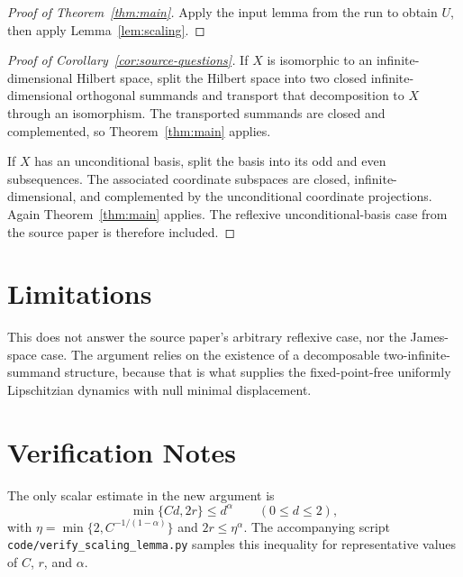 \documentclass[11pt]{article}
\begin{document}
\begin{proof}[Proof of Theorem~\ref{thm:main}]
Apply the input lemma from the run to obtain \(U\), then apply
Lemma~\ref{lem:scaling}.
\end{proof}

\begin{proof}[Proof of Corollary~\ref{cor:source-questions}]
If \(X\) is isomorphic to an infinite-dimensional Hilbert space, split the
Hilbert space into two closed infinite-dimensional orthogonal summands and
transport that decomposition to \(X\) through an isomorphism.  The transported
summands are closed and complemented, so Theorem~\ref{thm:main} applies.

If \(X\) has an unconditional basis, split the basis into its odd and even
subsequences.  The associated coordinate subspaces are closed,
infinite-dimensional, and complemented by the unconditional coordinate
projections.  Again Theorem~\ref{thm:main} applies.  The reflexive
unconditional-basis case from the source paper is therefore included.
\end{proof}

\section*{Limitations}

This does not answer the source paper's arbitrary reflexive case, nor the
James-space case.  The argument relies on the existence of a decomposable
two-infinite-summand structure, because that is what supplies the
fixed-point-free uniformly Lipschitzian dynamics with null minimal
displacement.

\section*{Verification Notes}

The only scalar estimate in the new argument is
\[
  \min\{Cd,2r\}\leq d^\alpha\qquad(0\leq d\leq2),
\]
with \(\eta=\min\{2,C^{-1/(1-\alpha)}\}\) and \(2r\leq\eta^\alpha\).
The accompanying script \texttt{code/verify\_scaling\_lemma.py} samples this
inequality for representative values of \(C\), \(r\), and \(\alpha\).
\end{document}
